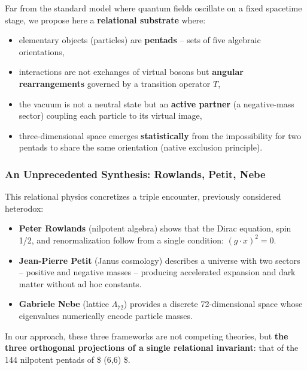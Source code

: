 \documentclass[11pt]{article}
\providecommand{\tightlist}{\setlength{\itemsep}{2pt}\setlength{\parskip}{6pt}}
\providecommand{\tightlist}{%
  \setlength{\itemsep}{2pt}\setlength{\parskip}{6pt}
}
\begin{document}
Far from the standard model where quantum fields oscillate on a fixed
spacetime stage, we propose here a \textbf{relational substrate} where:

\begin{itemize}
\tightlist
\item
  elementary objects (particles) are \textbf{pentads} -- sets of five
  algebraic orientations,
\item
  interactions are not exchanges of virtual bosons but \textbf{angular
  rearrangements} governed by a transition operator \(T\),
\item
  the vacuum is not a neutral state but an \textbf{active partner} (a
  negative-mass sector) coupling each particle to its virtual image,
\item
  three-dimensional space emerges \textbf{statistically} from the
  impossibility for two pentads to share the same orientation (native
  exclusion principle).
\end{itemize}

\hypertarget{an-unprecedented-synthesis-rowlands-petit-nebe}{%
\subsubsection{An Unprecedented Synthesis: Rowlands, Petit,
Nebe}\label{an-unprecedented-synthesis-rowlands-petit-nebe}}

This relational physics concretizes a triple encounter, previously
considered heterodox:

\begin{itemize}
\tightlist
\item
  \textbf{Peter Rowlands} (nilpotent algebra) shows that the Dirac
  equation, spin 1/2, and renormalization follow from a single
  condition: \((g\cdot x)^2 = 0\).
\item
  \textbf{Jean-Pierre Petit} (Janus cosmology) describes a universe with
  two sectors -- positive and negative masses -- producing accelerated
  expansion and dark matter without ad hoc constants.
\item
  \textbf{Gabriele Nebe} (lattice \(\Lambda_{72}\)) provides a discrete
  72-dimensional space whose eigenvalues numerically encode particle
  masses.
\end{itemize}

In our approach, these three frameworks are not competing theories, but
\textbf{the three orthogonal projections of a single relational
invariant}: that of the 144 nilpotent pentads of \$ (6,6) \$.
\end{document}
